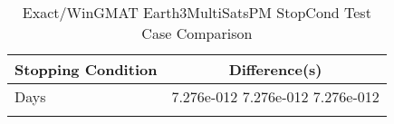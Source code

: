 \begin{table}[htbp!]
\centering
\caption{ Exact/WinGMAT Earth3MultiSatsPM StopCond Test Case Comparison}
      \begin{tabular}{lc}
      \hline\hline
          Stopping Condition & Difference(s) \\
         \hline
         Days &  7.276e-012 7.276e-012 7.276e-012 \\
      \hline\hline
      \label{Table: Exact-WinGMAT Earth3MultiSatsPM StopCond Table} 
\end{tabular}
\end{table}
